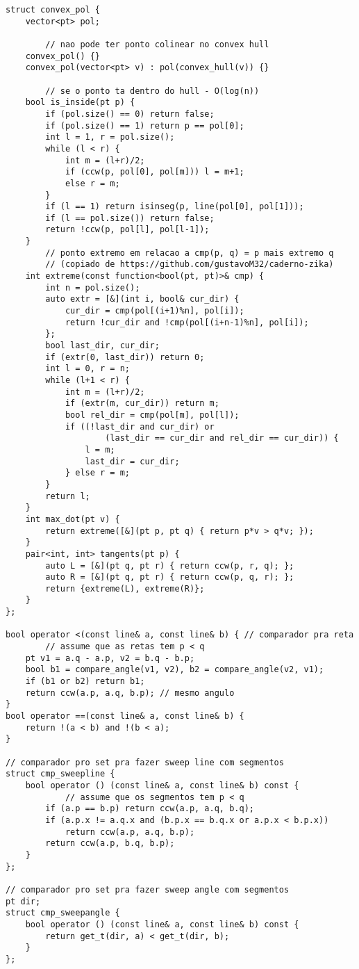 \documentclass[11pt, a4paper, twoside]{article}
\begin{document}
\begin{verbatim}
struct convex_pol {
	vector<pt> pol;
    
    	// nao pode ter ponto colinear no convex hull
	convex_pol() {}
	convex_pol(vector<pt> v) : pol(convex_hull(v)) {}
    
    	// se o ponto ta dentro do hull - O(log(n))
	bool is_inside(pt p) {
		if (pol.size() == 0) return false;
		if (pol.size() == 1) return p == pol[0];
		int l = 1, r = pol.size();
		while (l < r) {
			int m = (l+r)/2;
			if (ccw(p, pol[0], pol[m])) l = m+1;
			else r = m;
		}
		if (l == 1) return isinseg(p, line(pol[0], pol[1]));
		if (l == pol.size()) return false;
		return !ccw(p, pol[l], pol[l-1]);
	}
    	// ponto extremo em relacao a cmp(p, q) = p mais extremo q
    	// (copiado de https://github.com/gustavoM32/caderno-zika)
	int extreme(const function<bool(pt, pt)>& cmp) {
		int n = pol.size();
		auto extr = [&](int i, bool& cur_dir) {
			cur_dir = cmp(pol[(i+1)%n], pol[i]);
			return !cur_dir and !cmp(pol[(i+n-1)%n], pol[i]);
		};
		bool last_dir, cur_dir;
		if (extr(0, last_dir)) return 0;
		int l = 0, r = n;
		while (l+1 < r) {
			int m = (l+r)/2;
			if (extr(m, cur_dir)) return m;
			bool rel_dir = cmp(pol[m], pol[l]);
			if ((!last_dir and cur_dir) or
					(last_dir == cur_dir and rel_dir == cur_dir)) {
				l = m;
				last_dir = cur_dir;
			} else r = m;
		}
		return l;
	}
	int max_dot(pt v) {
		return extreme([&](pt p, pt q) { return p*v > q*v; });
	}
	pair<int, int> tangents(pt p) {
		auto L = [&](pt q, pt r) { return ccw(p, r, q); };
		auto R = [&](pt q, pt r) { return ccw(p, q, r); };
		return {extreme(L), extreme(R)};
	}
};

bool operator <(const line& a, const line& b) { // comparador pra reta
    	// assume que as retas tem p < q
	pt v1 = a.q - a.p, v2 = b.q - b.p;
	bool b1 = compare_angle(v1, v2), b2 = compare_angle(v2, v1);
	if (b1 or b2) return b1;
	return ccw(a.p, a.q, b.p); // mesmo angulo
}
bool operator ==(const line& a, const line& b) {
	return !(a < b) and !(b < a);
}

// comparador pro set pra fazer sweep line com segmentos
struct cmp_sweepline {
	bool operator () (const line& a, const line& b) const {
    		// assume que os segmentos tem p < q
		if (a.p == b.p) return ccw(a.p, a.q, b.q);
		if (a.p.x != a.q.x and (b.p.x == b.q.x or a.p.x < b.p.x))
			return ccw(a.p, a.q, b.p);
		return ccw(a.p, b.q, b.p);
	}
};

// comparador pro set pra fazer sweep angle com segmentos
pt dir;
struct cmp_sweepangle {
    bool operator () (const line& a, const line& b) const {
        return get_t(dir, a) < get_t(dir, b);
    }
};
\end{verbatim}
\end{document}
